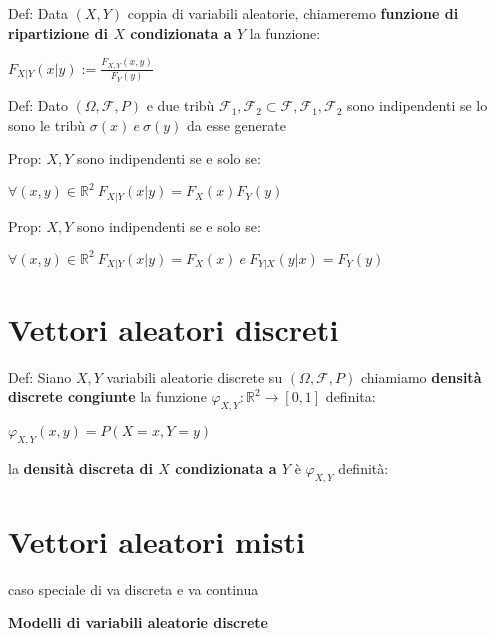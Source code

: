 \documentclass[12pt, a4paper]{article}
\begin{document}
Def: Data $(X,Y)$ coppia di variabili aleatorie, chiameremo \textbf{funzione di ripartizione di $X$ condizionata a $Y$}
la funzione:
\begin{center}
    $F_{X|Y}(x|y):= \frac{F_{X,Y}(x,y)}{F_{Y}(y)}$
\end{center}

Def: Dato $(\Omega,\mathcal{F},P)$ e due tribù $\mathcal{F}_{1}, \mathcal{F}_{2}\subset\mathcal{F},\mathcal{F}_{1},
\mathcal{F}_{2}$ sono indipendenti se lo sono le tribù $\sigma(x)\ e\ \sigma(y)$ da esse generate 

Prop: $X,Y$ sono indipendenti se e solo se:
\begin{center}
    $\forall(x,y)\in\mathbb{R}^{2}\ F_{X|Y}(x|y)=F_{X}(x)F_{Y}(y)$    
\end{center}

Prop: $X,Y$ sono indipendenti se e solo se:
\begin{center}
    $\forall(x,y)\in\mathbb{R}^{2}\ F_{X|Y}(x|y)=F_{X}(x)\ e\ F_{Y|X}(y|x)=F_{Y}(y)$    
\end{center}

\section{Vettori aleatori discreti}

Def: Siano $X,Y$ variabili aleatorie discrete su $(\Omega,\mathcal{F},P)$ chiamiamo \textbf{densità discrete congiunte}
la funzione $\varphi_{X,Y}:\mathbb{R}^{2}\rightarrow [0,1]$ definita:
\begin{center}
        $\varphi_{X,Y}(x,y)=P(X=x, Y=y)$
\end{center}
la \textbf{densità discreta di $X$ condizionata a $Y$} è  $\varphi_{X,Y}$ definità:

\newpage
\section{Vettori aleatori misti}
caso speciale di va discreta e va continua

\begin{center}
    \textbf{Modelli di variabili aleatorie discrete}
\end{center}
\end{document}
